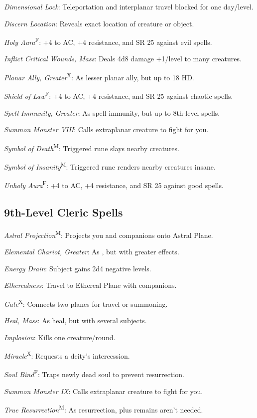 \textit{Dimensional Lock}: Teleportation and interplanar travel blocked for one day/level.

\textit{Discern Location}: Reveals exact location of creature or object.



\textit{Holy Aura}\textsuperscript{F}: +4 to AC, +4 resistance, and SR 25 against evil spells.

\textit{Inflict Critical Wounds, Mass}: Deals 4d8 damage +1/level to many creatures.

\textit{Planar Ally, Greater}\textsuperscript{X}: As lesser planar ally, but up to 18 HD.

\textit{Shield of Law}\textsuperscript{F}: +4 to AC, +4 resistance, and SR 25 against chaotic spells.

\textit{Spell Immunity, Greater}: As spell immunity, but up to 8th-level spells.

\textit{Summon Monster VIII}: Calls extraplanar creature to fight for you.

\textit{Symbol of Death}\textsuperscript{M}: Triggered rune slays nearby creatures.

\textit{Symbol of Insanity}\textsuperscript{M}: Triggered rune renders nearby creatures insane.

\textit{Unholy Aura}\textsuperscript{F}: +4 to AC, +4 resistance, and SR 25 against good spells.



\subsection{9th-Level Cleric Spells}

\textit{Astral Projection}\textsuperscript{M}: Projects you and companions onto Astral Plane.

\textit{Elemental Chariot, Greater}: As , but with greater effects.

\textit{Energy Drain}: Subject gains 2d4 negative levels.

\textit{Etherealness}: Travel to Ethereal Plane with companions.

\textit{Gate}\textsuperscript{X}: Connects two planes for travel or summoning.

\textit{Heal, Mass}: As heal, but with several subjects.

\textit{Implosion}: Kills one creature/round.

\textit{Miracle}\textsuperscript{X}: Requests a deity's intercession.

\textit{Soul Bind}\textsuperscript{F}: Traps newly dead soul to prevent resurrection.


\textit{Summon Monster IX}: Calls extraplanar creature to fight for you.

\textit{True Resurrection}\textsuperscript{M}: As resurrection, plus remains aren't needed.